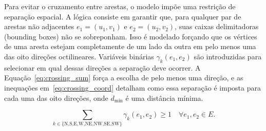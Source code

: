 \documentclass[cic,tc]{infufrgs}
\begin{document}
Para evitar o cruzamento entre arestas, o modelo impõe uma restrição de separação espacial. A lógica consiste em garantir que, para qualquer par de arestas não adjacentes $e_1=(u_1, v_1)$ e $e_2=(u_2, v_2)$, suas caixas delimitadoras (bounding boxes) não se sobreponham. Isso é modelado forçando que os vértices de uma aresta estejam completamente de um lado da outra em pelo menos uma das oito direções octilineares. Variáveis binárias $\gamma_k(e_1, e_2)$ são introduzidas para selecionar em qual dessas direções a separação deve ocorrer. A Equação~\ref{eq:crossing_sum} força a escolha de pelo menos uma direção, e as inequações em~\ref{eq:crossing_coord} detalham como essa separação é imposta para cada uma das oito direções, onde $d_{\text{min}}$ é uma distância mínima.

\begin{equation}
\sum_{k \in \{\text{N,S,E,W,NE,NW,SE,SW}\}} \gamma_k(e_1, e_2) \ge 1 \quad \forall e_1, e_2 \in E.
\label{eq:crossing_sum}
\end{equation}
\end{document}
